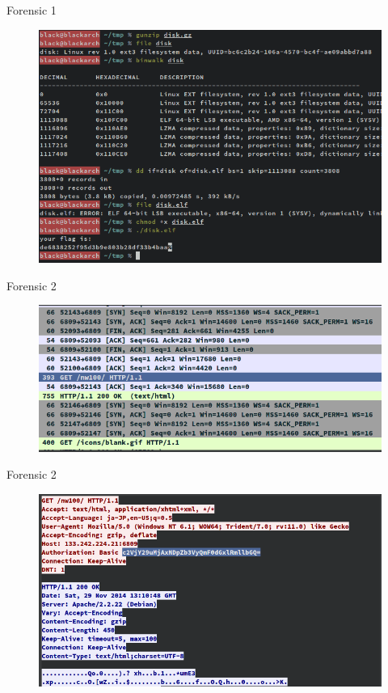 \documentclass[compress]{beamer}
\begin{document}
\begin{frame}{Forensic 1}
	\begin{figure}
		\centering
		\includegraphics[width=\textwidth]{images/f1.png}
	\end{figure}
\end{frame}

\begin{frame}{Forensic 2}
	\begin{figure}
		\centering
		\includegraphics[width=\linewidth]{images/f21.png}
	\end{figure}
\end{frame}

\begin{frame}{Forensic 2}
	\begin{figure}
		\centering
		\includegraphics[width=\textwidth]{images/f22.png}
	\end{figure}
\end{frame}
\end{document}

